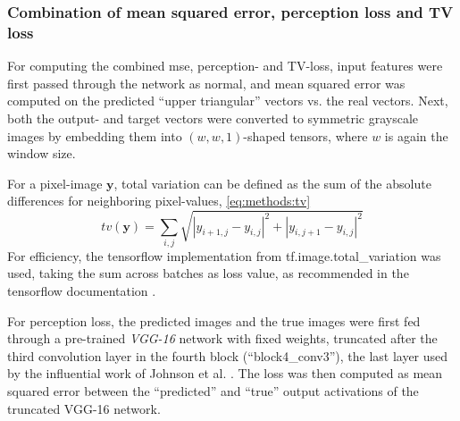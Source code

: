 \subsubsection{Combination of mean squared error, perception loss and TV loss} \label{sec:methods:combined_loss}
For computing the combined \acrshort{mse}, perception- and TV-loss,
input features were first passed through the network as normal,
and mean squared error was computed on the predicted ``upper triangular'' vectors vs. the real vectors.
Next, both the output- and target vectors were converted to symmetric grayscale images by embedding them into 
$(w, w, 1)$-shaped tensors, where $w$ is again the window size.

For a pixel-image $\mathbf{y}$, total variation can be defined as the sum of the absolute differences for neighboring pixel-values, \cref{eq:methods:tv} \cite{Rudin1992}
\begin{equation}
 tv(\mathbf{y}) = \sum_{i,j}\sqrt{|y_{i+1,j} - y_{i,j}|^2 + |y_{i,j+1} - y_{i,j} |^2 } \label{eq:methods:tv}
\end{equation}
For efficiency, the tensorflow implementation from tf.image.total\_variation was used,
taking the sum across batches as loss value, as recommended in the tensorflow documentation \cite{TensorflowTV2020}.

For perception loss, the predicted images and the true images were first fed through a pre-trained \emph{VGG-16} network with fixed weights, truncated after the third convolution layer
in the fourth block (``block4\_conv3''), the last layer used by the influential work of Johnson et al. \cite{Johnson2016}.
The loss was then computed as mean squared error between the ``predicted'' and ``true'' output activations of the truncated VGG-16 network.

